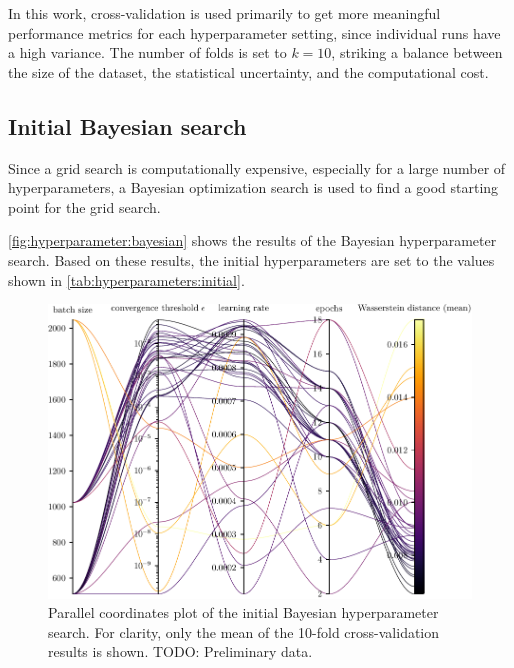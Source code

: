 In this work,
cross-validation is used primarily to get more meaningful performance metrics
for each hyperparameter setting,
  since individual runs have a high variance.
The number of folds is set to $k = 10$,
  striking a balance between
    the size of the dataset,
    the statistical uncertainty,
    and the computational cost.


\subsection{Initial Bayesian search} \label{sec:hyperparameters:initial_bayesian}
Since a grid search is computationally expensive,
  especially for a large number of hyperparameters,
a Bayesian optimization search \cite{wandb_bayesian} is used to find a good starting point for the grid search.

\autoref{fig:hyperparameter:bayesian} shows the results of the Bayesian hyperparameter search.
Based on these results,
the initial hyperparameters are set to the values shown in \autoref{tab:hyperparameters:initial}.


\begin{figure}
  \centering
  \includegraphics[scale=1]{content/plots/hyperparam/combined_pcplot_full.pdf}
  \caption{
    Parallel coordinates plot of the initial Bayesian hyperparameter search.
    For clarity, only the mean of the 10-fold cross-validation results is shown.
    TODO: Preliminary data.
    }
  \label{fig:hyperparameter:bayesian}
\end{figure}


